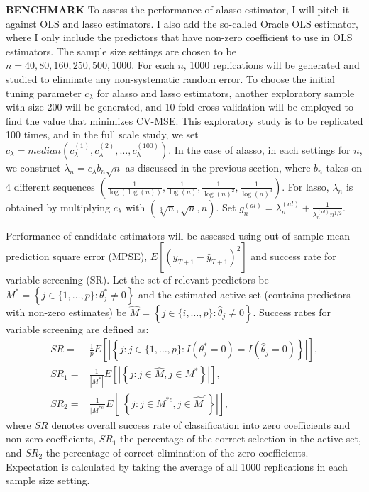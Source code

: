 \documentclass[12pt,a4paper]{article}
\begin{document}
\textbf{BENCHMARK} To assess the performance of alasso estimator, I will pitch it against OLS and lasso estimators. I also add the so-called Oracle OLS estimator, where I only include the predictors that have non-zero coefficient to use in OLS estimators. The sample size settings are chosen to be $ n = 40, 80, 160, 250, 500, 1000 $. For each $ n $, 1000 replications will be generated and studied to eliminate any non-systematic random error. To choose the initial tuning parameter $ c_\lambda $ for alasso and lasso estimators, another exploratory sample with size 200 will be generated, and 10-fold cross validation will be employed to find the value that minimizes CV-MSE. This exploratory study is to be replicated 100 times, and in the full scale study, we set $ c_\lambda = median\left(c^{(1)}_\lambda, c^{(2)}_\lambda, \ldots, c^{(100)}_\lambda\right) $. In the case of alasso, in each settings for $ n $, we construct $ \lambda_n = c_\lambda b_n \sqrt{n} $ as discussed in the previous section, where $ b_n $ takes on 4 different sequences $ \left(\frac{1}{\log(\log(n))}, \frac{1}{\log(n)}, \frac{1}{\log(n)^2}, \frac{1}{\log(n)^3}\right) $. For lasso, $ \lambda_n $ is obtained by multiplying $ c_\lambda $ with $ \left(\sqrt[3]{n}, \sqrt{n}, n \right) $. Set $ g_n^{(al)} = \lambda_n^{(al)} + \frac{1}{\lambda_n^{(al)} n^{1/2}} $.
	
	Performance of candidate estimators will be assessed using out-of-sample mean prediction square error (MPSE), $ E\left[(y_{T + 1} - \hat{y}_{T + 1})^2\right] $ and success rate for variable screening (SR). Let the set of relevant predictors be $ M^* = \left\lbrace j \in \{1, \ldots, p\}: \theta^*_j \neq 0 \right\rbrace $ and the estimated active set (contains predictors with non-zero estimates) be $ \hat{M} = \left\lbrace j \in \{i, \ldots, p\}:\hat{\theta}_j \neq 0 \right\rbrace $. Success rates for variable screening are defined as:
\begin{align*}
	SR   = & \frac{1}{p}E\left[ \left\lvert \left\lbrace j:j\in \{1, \ldots, p \}: I(\theta^*_j = 0) = I(\hat{\theta}_j = 0) \right\rbrace \right\rvert\right], \\
	SR_1 = & \frac{1}{|M^*|}E\left[ \left\lvert \left\lbrace j:j\in \hat{M}, j \in M^* \right\rbrace \right\rvert\right], \\
	SR_2 = & \frac{1}{|M^{*c|}}E\left[ \left\lvert \left\lbrace j:j\in M^{*c}, j \in \hat{M}^c \right\rbrace \right\rvert\right],
\end{align*}
where $ SR $ denotes overall success rate of classification into zero coefficients and non-zero coefficients, $ SR_1 $ the percentage of the correct selection in the active set, and $ SR_2 $ the percentage of correct elimination of the zero coefficients. Expectation is calculated by taking the average of all 1000 replications in each sample size setting.
\end{document}
